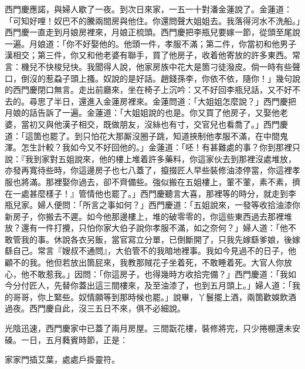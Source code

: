 西門慶應諾，與婦人歇了一夜。到次日來家，一五一十對潘金蓮說了。金蓮道：「可知好哩！奴巴不的騰兩間房與他住。你還問聲大姐姐去。我落得河水不洗船。」西門慶一直走到月娘房裡來，月娘正梳頭。西門慶把李瓶兒要嫁一節，從頭至尾說一遍。月娘道：「你不好娶他的。{}他頭一件，孝服不滿；第二件，你當初和他男子漢相交；第三件，你又和他老婆有聯手，買了他房子，收着他寄放的許多東西。{}常言：機兒不快梭兒快。我聞得人說，他家房族中花大是箇刁徒潑皮。倘一時有些聲口，倒沒的惹蝨子頭上搔。{}奴說的是好話。趙錢孫李，你依不依，隨你！」{}幾句說的西門慶閉口無言。走出前廳來，坐在椅子上沉吟：{}又不好回李瓶兒話，又不好不去的。尋思了半日，還進入金蓮房裡來。{}金蓮問道：「大姐姐怎麼說？」西門慶把月娘的話告訴了一遍。金蓮道：「大姐姐說的也是。{}你又買了他房子，又娶他老婆，當初又與他漢子相交，既做朋友，沒絲也有寸，交官兒也看喬了。」西門慶道：「這箇也罷了。{}到只怕花大那厮沒圈子跳，知道挾制他孝服不滿，在中間鬼渾。怎生計較？我如今又不好回他的。」金蓮道：「呸！有甚難處的事？你到那裡只說：『我到家對五姐說來，他的樓上堆着許多藥料，你這家伙去到那裡沒處堆放，亦發再寬待些時，你這邊房子也七八蓋了，攛掇匠人早些裝修油漆停當，你這裡孝服也將滿。那裡娶你過去，卻不齊備些。強似搬在五姐樓上，葷不葷，素不素，擠在一處甚麼樣子！』管情他也罷了。」西門慶聽言大喜，那裡等的時分，就走到李瓶兒家。婦人便問：「所言之事如何？」西門慶道：「五姐說來，一發等收拾油漆你新房子，你搬去不遲。如今他那邊樓上，堆的破零零的，你這些東西過去那裡堆放？還有一件打攪，只怕你家大伯子說你孝服不滿，{}如之奈何？」婦人道：「他不敢管我的事。休說各衣另飯，當官寫立分單，已倒斷開了，只我先嫁繇爹娘，後嫁繇自己。常言『嫂叔不通問』，大伯管不的我暗地裡事。我如今見過不的日子，他顧不的我。他但若放出箇屁來，我教那賊花子坐着死，不敢睡着死。大官人你放心，他不敢惹我。」因問：「你這房子，也得幾時方收拾完備？」西門慶道：「我如今分付匠人，先替你蓋出這三間樓來，及至油漆了，也到五月頭上。」婦人道：「我的哥哥，你上緊些。奴情願等到那時候也罷。」說畢，丫鬟擺上酒，兩箇歡娛飲酒過夜。西門慶自此，沒三五日不來，俱不必細說。

光陰迅速，西門慶家中已蓋了兩月房屋。三間翫花樓，裝修將完，只少捲棚還未安磉。一日，五月蕤賓時節，正是：

\begin{myquote}
家家門插艾葉，處處戶掛靈符。
\end{myquote}

